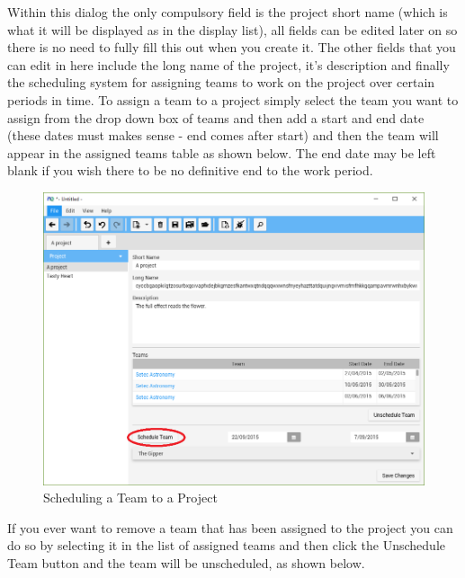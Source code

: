 Within this dialog the only compulsory field is the project short name (which is what it will be displayed as in the display list), all fields can be edited later on so there is no need to fully fill this out when you create it.
\newline
The other fields that you can edit in here include the long name of the project, it's description and finally the scheduling system for assigning teams to work on the project over certain periods in time. To assign a team to a project simply select the team you want to assign from the drop down box of teams and then add a start and end date (these dates must makes sense - end comes after start) and then the team will appear in the assigned teams table as shown below. The end date may be left blank if you wish there to be no definitive end to the work period.

\begin{figure}[H]
\centering
\includegraphics[width=\textwidth]{images/screenshots/projects2.PNG}
\caption{Scheduling a Team to a Project}
\label{fig:new_project}
\end{figure}

If you ever want to remove a team that has been assigned to the project you can do so by selecting it in the list of assigned teams and then click the Unschedule Team button and the team will be unscheduled, as shown below.

